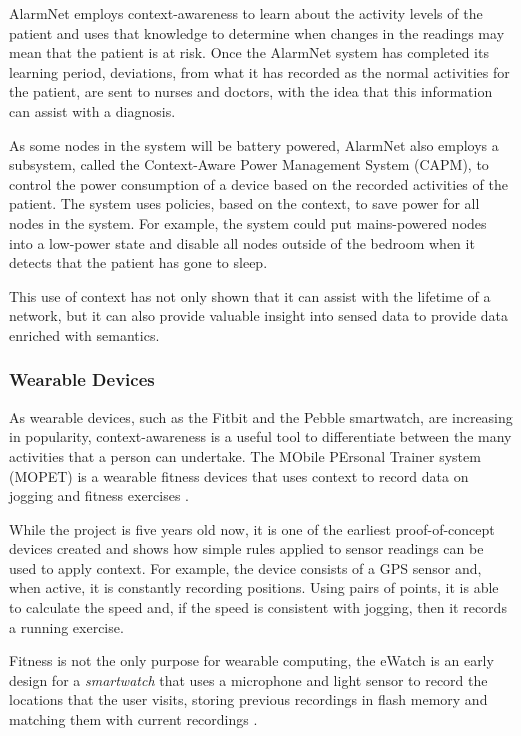 AlarmNet employs context-awareness to learn about the activity levels of the patient and uses that knowledge to determine when changes in the readings may mean that the patient is at risk. Once the AlarmNet system has completed its learning period, deviations, from what it has recorded as the normal activities for the patient, are sent to nurses and doctors, with the idea that this information can assist with a diagnosis.

As some nodes in the system will be battery powered, AlarmNet also employs a subsystem, called the Context-Aware Power Management System (CAPM), to control the power consumption of a device based on the recorded activities of the patient. The system uses policies, based on the context, to save power for all nodes in the system. For example, the system could put mains-powered nodes into a low-power state and disable all nodes outside of the bedroom when it detects that the patient has gone to sleep.

This use of context has not only shown that it can assist with the lifetime of a network, but it can also provide valuable insight into sensed data to provide data enriched with semantics.

	\subsubsection{Wearable Devices}
As wearable devices, such as the Fitbit and the Pebble smartwatch, are increasing in popularity, context-awareness is a useful tool to differentiate between the many activities that a person can undertake. The MObile PErsonal Trainer system (MOPET) is a wearable fitness devices that uses context to record data on jogging and fitness exercises \cite{Buttussi2008}. 

While the project is five years old now, it is one of the earliest proof-of-concept devices created and shows how simple rules applied to sensor readings can be used to apply context. For example, the device consists of a GPS sensor and, when active, it is constantly recording positions. Using pairs of points, it is able to calculate the speed and, if the speed is consistent with jogging, then it records a running exercise.

Fitness is not the only purpose for wearable computing, the eWatch is an early design for a \textit{smartwatch} that uses a microphone and light sensor to record the locations that the user visits, storing previous recordings in flash memory and matching them with current recordings \cite{Maurer}.


